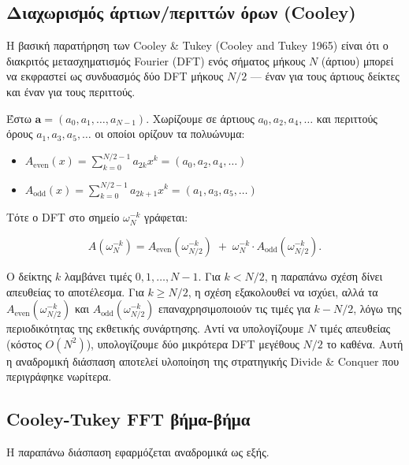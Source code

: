 \subsection{Διαχωρισμός άρτιων/περιττών όρων
(Cooley)}\label{ux3b4ux3b9ux3b1ux3c7ux3c9ux3c1ux3b9ux3c3ux3bcux3ccux3c2-ux3acux3c1ux3c4ux3b9ux3c9ux3bdux3c0ux3b5ux3c1ux3b9ux3c4ux3c4ux3ceux3bd-ux3ccux3c1ux3c9ux3bd-cooley}

Η βασική παρατήρηση των Cooley \& Tukey (Cooley and Tukey 1965) είναι
ότι ο διακριτός μετασχηματισμός Fourier (DFT) ενός σήματος μήκους \(N\)
(άρτιου) μπορεί να εκφραστεί ως συνδυασμός δύο DFT μήκους \(N/2\) ---
έναν για τους άρτιους δείκτες και έναν για τους περιττούς.

Έστω \(\mathbf{a} = (a_0, a_1, \dots, a_{N-1})\). Χωρίζουμε σε άρτιους
\(a_0, a_2, a_4, \dots\) και περιττούς όρους \(a_1, a_3, a_5, \dots\) οι
οποίοι ορίζουν τα πολυώνυμα:

\begin{itemize}
\tightlist
\item
  \(A_{\text{even}}(x) = \sum_{k=0}^{N/2-1} a_{2k} x^k = (a_0, a_2, a_4, \ldots)\)
\item
  \(A_{\text{odd}}(x) = \sum_{k=0}^{N/2-1} a_{2k+1} x^k = (a_1, a_3, a_5, \ldots)\)
\end{itemize}

Τότε ο DFT στο σημείο \(\omega_N^{-k}\) γράφεται:

\[
A(\omega_N^{-k}) = A_{\text{even}}(\omega_{N/2}^{-k}) \;+\; \omega_N^{-k} \cdot A_{\text{odd}}(\omega_{N/2}^{-k}).
\]

Ο δείκτης \(k\) λαμβάνει τιμές \(0, 1, \ldots, N-1\). Για \(k < N/2\), η
παραπάνω σχέση δίνει απευθείας το αποτέλεσμα. Για \(k \ge N/2\), η σχέση
εξακολουθεί να ισχύει, αλλά τα \(A_{\text{even}}(\omega_{N/2}^{-k})\)
και \(A_{\text{odd}}(\omega_{N/2}^{-k})\) επαναχρησιμοποιούν τις τιμές
για \(k - N/2\), λόγω της περιοδικότητας της εκθετικής συνάρτησης. Αντί
να υπολογίζουμε \(N\) τιμές απευθείας (κόστος \(O(N^2)\)), υπολογίζουμε
δύο μικρότερα DFT μεγέθους \(N/2\) το καθένα. Αυτή η αναδρομική διάσπαση
αποτελεί υλοποίηση της στρατηγικής Divide \& Conquer που περιγράφηκε
νωρίτερα.

\subsection{Cooley-Tukey FFT
βήμα-βήμα}\label{cooley-tukey-fft-ux3b2ux3aeux3bcux3b1-ux3b2ux3aeux3bcux3b1}

Η παραπάνω διάσπαση εφαρμόζεται αναδρομικά ως εξής.

